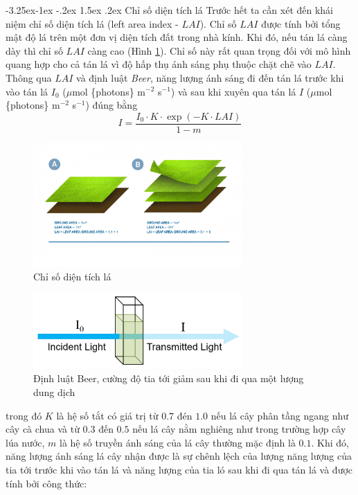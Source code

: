 \documentclass[a4paper]{article}
\makeatletter
\newcounter {subsubsubsection}[subsubsection]
\newcommand\subsubsubsection{\@startsection{subsubsubsection}{4}{\z@}%
                                     {-3.25ex\@plus -1ex \@minus -.2ex}%
                                     {1.5ex \@plus .2ex}%
                                     {\normalfont\normalsize\bfseries}}
\makeatother
\begin{document}
\subsubsubsection{Chỉ số diện tích lá}\label{LAI}
Trước hết ta cần xét đến khái niệm chỉ số diện tích lá (left area index - $LAI$). Chỉ số $LAI$ được tính bởi tổng mật độ lá trên một đơn vị diện tích đất trong nhà kính. Khi đó, nếu tán lá càng dày thì chỉ số $LAI$ càng cao (Hình \ref{fig:lai}). Chỉ số này rất quan trọng đối với mô hình quang hợp cho cả tán lá vì độ hấp thụ ánh sáng phụ thuộc chặt chẽ vào $LAI$. Thông qua $LAI$ và định luật \emph{Beer}, năng lượng ánh sáng đi đến tán lá trước khi vào tán lá $I_0$ ($\mu$mol \{photons\} m$^{-2}$ s$^{-1}$) và sau khi xuyên qua tán lá $I$ ($\mu$mol \{photons\} m$^{-2}$ s$^{-1}$) đúng bằng
\begin{equation}\label{eq:26}
    I = \frac{I_0\cdot K\cdot \exp{(-K\cdot LAI)}}{1-m}
\end{equation}
\begin{figure}[!h]
    \centering
    \includegraphics[width=8cm]{lai.png}
    \caption{Chỉ số diện tích lá}
    \label{fig:lai}
\end{figure}
\begin{figure}[!h]
    \centering
    \includegraphics[width=8cm]{beerlaw.png}
    \caption{Định luật Beer, cường độ tia tới giảm sau khi đi qua một lượng dung dịch}
    \label{fig:beerlaw}
\end{figure} \par
trong đó $K$ là hệ số tắt có giá trị từ $0.7$ đén $1.0$ nếu lá cây phân tầng ngang như cây cà chua và từ $0.3$ đến $0.5$ nếu lá cây nằm nghiêng như trong trường hợp cây lúa nước, $m$ là hệ số truyền ánh sáng của lá cây thường mặc định là $0.1$. Khi đó, năng lượng ánh sáng lá cây nhận được là sự chênh lệch của lượng năng lượng của tia tới trước khi vào tán lá và năng lượng của tia ló sau khi đi qua tán lá và được tính bởi công thức:
\end{document}
